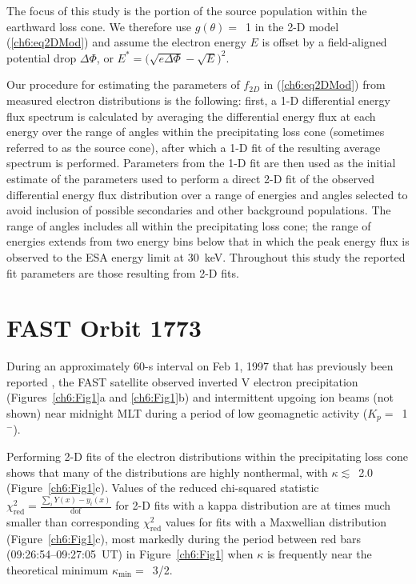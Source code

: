 
  The focus of this study is the portion of the source population within the
  earthward loss cone. We therefore use $g(\theta) =$~1 in the 2-D model
  (\ref{ch6:eq2DMod}) and assume the electron energy $E$ is offset by a
  field-aligned potential drop $\Delta \Phi$, or $E^* = \big( \sqrt{e \Delta
    \Phi} - \sqrt{E} \big)^2$.

  Our procedure for estimating the parameters of $f_{2D}$ in (\ref{ch6:eq2DMod})
  from measured electron distributions is the following: first, a 1-D
  differential energy flux spectrum is calculated by averaging the differential
  energy flux at each energy over the range of angles within the precipitating
  loss cone (sometimes referred to as the source cone), after which a 1-D fit of
  the resulting average spectrum is performed. Parameters from the 1-D fit are
  then used as the initial estimate of the parameters used to perform a direct
  2-D fit of the observed differential energy flux distribution over a range of
  energies and angles selected to avoid inclusion of possible secondaries and
  other background populations. The range of angles includes all within the
  precipitating loss cone; the range of energies extends
  from two energy bins below that in which the peak energy flux is observed to
  the ESA energy limit at 30~keV. Throughout this study the reported fit
  parameters are those resulting from 2-D fits.

  \section{FAST Orbit 1773}

  During an approximately 60-s interval on Feb 1, 1997 that has previously been
  reported \citep{Elphic1998,Chaston2002b}, the FAST satellite observed inverted
  V electron precipitation (Figures~\ref{ch6:Fig1}a and \ref{ch6:Fig1}b) and
  intermittent upgoing ion beams (not shown) near midnight MLT during a period
  of low geomagnetic activity ($K_p =$~1$^-$).

  Performing 2-D fits of the electron distributions within the precipitating
  loss cone shows that many of the distributions are highly nonthermal, with
  $\kappa \lesssim$~2.0 (Figure~\ref{ch6:Fig1}c). Values of the reduced
  chi-squared statistic $\chi^2_{\mathrm{red}} = \frac{\sum_i Y(x) -
    y_i(x)}{\mathrm{dof}}$ for 2-D fits with a kappa distribution are at times
  much smaller than corresponding $\chi^2_{\textrm{red}}$ values for fits with a
  Maxwellian distribution (Figure~\ref{ch6:Fig1}c), most markedly during the
  period between red bars (09:26:54--09:27:05~UT) in Figure~\ref{ch6:Fig1} when
  $\kappa$ is frequently near the theoretical minimum $\kappa_{\mathrm{min}}
  =$~3/2.

